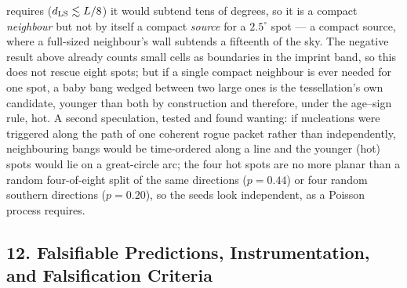 \documentclass[
  11pt,
]{article}
\begin{document}
requires (\(d_{\rm LS} \lesssim L/8\)) it would subtend tens of degrees,
so it is a compact \emph{neighbour} but not by itself a compact
\emph{source} for a \(2.5^\circ\) spot --- a compact source, where a
full-sized neighbour's wall subtends a fifteenth of the sky. The
negative result above already counts small cells as boundaries in the
imprint band, so this does not rescue eight spots; but if a single
compact neighbour is ever needed for one spot, a baby bang wedged
between two large ones is the tessellation's own candidate, younger than
both by construction and therefore, under the age--sign rule, hot. A
second speculation, tested and found wanting: if nucleations were
triggered along the path of one coherent rogue packet rather than
independently, neighbouring bangs would be time-ordered along a line and
the younger (hot) spots would lie on a great-circle arc; the four hot
spots are no more planar than a random four-of-eight split of the same
directions (\(p = 0.44\)) or four random southern directions
(\(p = 0.20\)), so the seeds look independent, as a Poisson process
requires.

\hypertarget{falsifiable-predictions-instrumentation-and-falsification-criteria}{%
\subsection{\texorpdfstring{\textbf{12. Falsifiable Predictions,
Instrumentation, and Falsification
Criteria}}{12. Falsifiable Predictions, Instrumentation, and Falsification Criteria}}\label{falsifiable-predictions-instrumentation-and-falsification-criteria}}
\end{document}
